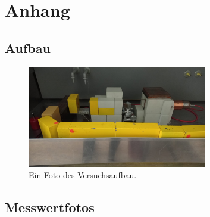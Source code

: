 \newpage
\section{Anhang}






%

\subsection{Aufbau}

\begin{figure}[h]
    \centering
    \includegraphics[width=0.7\textwidth]{latex/images/Aufbau_real.jpeg}
    \caption{Ein Foto des Versuchsaufbau.}
\end{figure}


\subsection{Messwertfotos}

